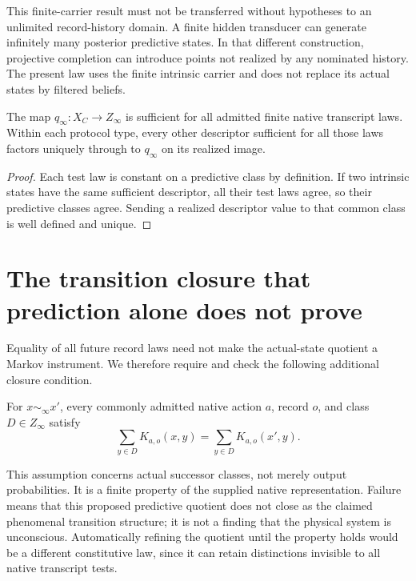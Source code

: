 This finite-carrier result must not be transferred without hypotheses
to an unlimited record-history domain. A finite hidden transducer can
generate infinitely many posterior predictive states. In that
different construction, projective completion can introduce points
not realized by any nominated history. The present law uses the
finite intrinsic carrier and does not replace its actual states by
filtered beliefs.


\begin{theorem}\label{thm:pred-min}
The map $q_\infty:X_C\to Z_\infty$ is sufficient for all admitted finite native transcript laws. Within each protocol type, every other descriptor sufficient for all those laws factors uniquely through to $q_\infty$ on its realized image.
\end{theorem}
\begin{proof}
Each test law is constant on a predictive class by definition. If two intrinsic states have the same sufficient descriptor, all their test laws agree, so their predictive classes agree. Sending a realized descriptor value to that common class is well defined and unique.
\end{proof}

\section{The transition closure that prediction alone does not prove}
\label{sec:spc2-fibre-congruence}
Equality of all future record laws need not make the actual-state
quotient a Markov instrument. We therefore require and check the
following additional closure condition.

\begin{assumption}
\label{ass:spc2-congruence}
For $x\sim_\infty x'$, every commonly admitted native action $a$,
record $o$, and class $D\in Z_\infty$ satisfy
\[
 \sum_{y\in D}K_{a,o}(x,y)
 =\sum_{y\in D}K_{a,o}(x',y).
\]
\end{assumption}

This assumption concerns actual successor classes, not merely output
probabilities. It is a finite property of the supplied native
representation. Failure means that this proposed predictive quotient
does not close as the claimed phenomenal transition structure; it is
not a finding that the physical system is unconscious. Automatically
refining the quotient until the property holds would be a different
constitutive law, since it can retain distinctions invisible to all
native transcript tests.

